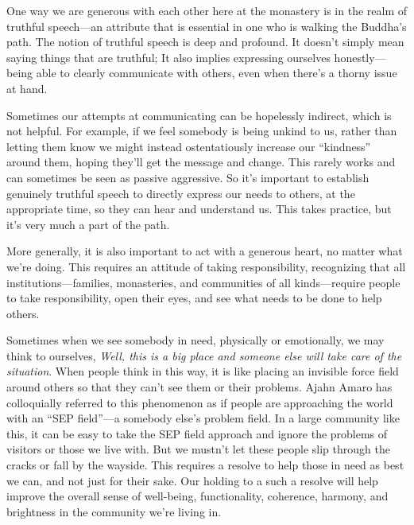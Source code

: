 
One way we are generous with each other here at the monastery is in the 
realm of truthful speech---an attribute that is essential in one who is 
walking the Buddha's path. The notion of truthful speech is deep and 
profound. It doesn't simply mean saying things that are truthful; It 
also implies expressing ourselves honestly---being able to clearly 
communicate with others, even when there's a thorny issue at hand.

Sometimes our attempts at communicating can be hopelessly indirect, 
which is not helpful. For example, if we feel somebody is being unkind 
to us, rather than letting them know we might instead ostentatiously 
increase our ``kindness'' around them, hoping they'll get the message 
and change. This rarely works and can sometimes be seen as passive 
aggressive. So it's important to establish genuinely truthful speech to 
directly express our needs to others, at the appropriate time, so they 
can hear and understand us. This takes practice, but it's very much a 
part of the path.

More generally, it is also important to act with a generous heart, no 
matter what we're doing. This requires an attitude of taking 
responsibility, recognizing that all institutions---families, 
monasteries, and communities of all kinds---require people to take 
responsibility, open their eyes, and see what needs to be done to help 
others.

Sometimes when we see somebody in need, physically or emotionally, we 
may think to ourselves, \emph{Well, this is a big place and someone 
else will take care of the situation}. When people think in this way, 
it is like placing an invisible force field around others so that they 
can't see them or their problems. Ajahn Amaro has colloquially referred 
to this phenomenon as if people are approaching the world with an ``SEP 
field''---a somebody else's problem field. In a large community like 
this, it can be easy to take the SEP field approach and ignore the 
problems of visitors or those we live with. But we mustn't let these 
people slip through the cracks or fall by the wayside. This requires a 
resolve to help those in need as best we can, and not just for their 
sake. Our holding to a such a resolve will help improve the overall 
sense of well-being, functionality, coherence, harmony, and brightness 
in the community we're living in.

